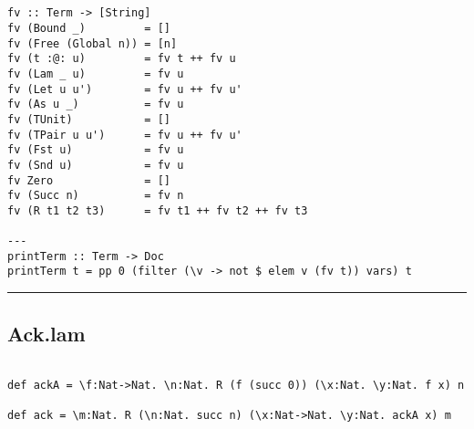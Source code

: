 \documentclass[a4paper]{article}
\begin{document}
\pagebreak
\begin{lstlisting}


fv :: Term -> [String]
fv (Bound _)         = []
fv (Free (Global n)) = [n]
fv (t :@: u)         = fv t ++ fv u
fv (Lam _ u)         = fv u
fv (Let u u')        = fv u ++ fv u'
fv (As u _)          = fv u
fv (TUnit)           = []
fv (TPair u u')      = fv u ++ fv u'
fv (Fst u)           = fv u
fv (Snd u)           = fv u
fv Zero              = []
fv (Succ n)          = fv n
fv (R t1 t2 t3)      = fv t1 ++ fv t2 ++ fv t3

---
printTerm :: Term -> Doc
printTerm t = pp 0 (filter (\v -> not $ elem v (fv t)) vars) t

\end{lstlisting}

\bigskip
\bigskip
\noindent\rule{16cm}{0.4pt}
\subsection*{Ack.lam}
\begin{lstlisting}

def ackA = \f:Nat->Nat. \n:Nat. R (f (succ 0)) (\x:Nat. \y:Nat. f x) n

def ack = \m:Nat. R (\n:Nat. succ n) (\x:Nat->Nat. \y:Nat. ackA x) m

\end{lstlisting}
\end{document}
